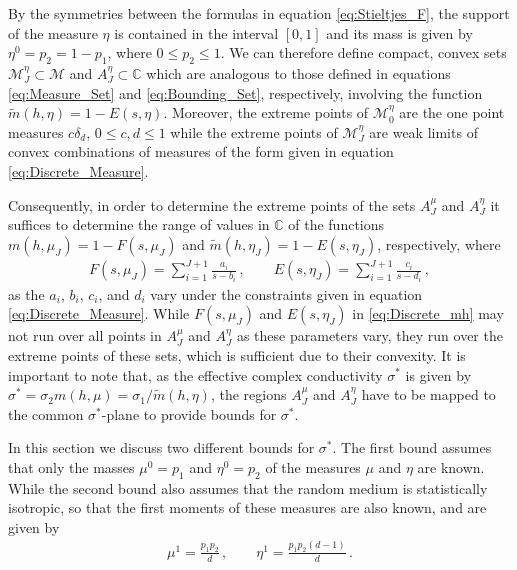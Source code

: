 \documentclass{cmslatex}
\begin{document}
By the symmetries between the formulas in equation
\eqref{eq:Stieltjes_F}, the support of the measure $\eta$ is contained in
the interval $[0,1]$ and its mass is given by $\eta^0=p_2=1-p_1$, where
$0\leq p_2\leq1$. We can therefore define compact, convex sets
$\mathscr{M}_J^\eta\subset\mathscr{M}$ and $A_J^\eta\subset\mathbb{C}$ which are
analogous to those defined in equations \eqref{eq:Measure_Set} and
\eqref{eq:Bounding_Set}, respectively, involving the function
$\tilde{m}(h,\eta)=1-E(s,\eta)$. Moreover, the extreme points of
$\mathscr{M}_0^\eta$ are the one point measures $c\delta_d$, $0\leq c,d\leq1$ 
while the extreme points of $\mathscr{M}_J^\eta$ are weak limits
of convex combinations of measures of the form given in equation
\eqref{eq:Discrete_Measure}. 



Consequently, in order to determine the extreme
points of the sets $A_J^\mu$ and $A_J^\eta$ it suffices to determine the
range of values in $\mathbb{C}$ of the functions $m(h,\mu_J)=1-F(s,\mu_J)$
and $\tilde{m}(h,\eta_J)=1-E(s,\eta_J)$, respectively, where  
%
\begin{align}\label{eq:Discrete_mh}
  F(s,\mu_J)=\sum_{i=1}^{J+1}\frac{a_i}{s-b_i}\,, \qquad
  E(s,\eta_J)=\sum_{i=1}^{J+1}\frac{c_i}{s-d_i}\,,
\end{align}
as the $a_i$, $b_i$, $c_i$, and $d_i$ vary under the
constraints given in equation  \eqref{eq:Discrete_Measure}. While
$F(s,\mu_J)$ and $E(s,\eta_J)$ in 
\eqref{eq:Discrete_mh} may not run over all points in $A_J^\mu$ and
$A_J^\eta$ as these parameters vary, they run over the
extreme points of these sets, which is sufficient due to their
convexity. It is important to note that, as the effective complex
conductivity $\sigma^*$ is given by $\sigma^*=\sigma_2m(h,\mu)=\sigma_1/\tilde{m}(h,\eta)$, the
regions $A_J^\mu$ and $A_J^\eta$ have to be mapped to the common
$\sigma^*$-plane to provide bounds for $\sigma^*$.    





In this section we discuss two different bounds for $\sigma^*$. The first
bound assumes that only the masses $\mu^0=p_1$ and $\eta^0=p_2$ of the
measures $\mu$ and $\eta$ are known. While the second bound also assumes
that the random medium is statistically isotropic, so that the first
moments of these measures are also known, and are given by
\cite{Golden:1986:BCP}   
%
\begin{align}\label{eq:First_Moments}
  \mu^1=\frac{p_1p_2}{d}\,, \qquad
  \eta^1=\frac{p_1p_2(d-1)}{d}\,.
\end{align}
%
\end{document}
